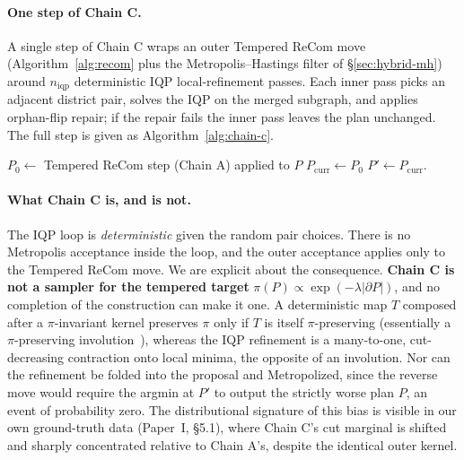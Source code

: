 \documentclass[11pt]{article}
\begin{document}
\paragraph{One step of Chain C.}\label{sec:chain-c-step}
A single step of Chain C wraps an outer Tempered ReCom move
(Algorithm~\ref{alg:recom} plus the Metropolis--Hastings filter of
\S\ref{sec:hybrid-mh}) around $n_{\mathrm{iqp}}$ deterministic
IQP local-refinement passes. Each inner pass picks an adjacent district
pair, solves the IQP on the merged subgraph, and applies orphan-flip
repair; if the repair fails the inner pass leaves the plan unchanged.
The full step is given as Algorithm~\ref{alg:chain-c}.

\begin{algorithm}[H]
\caption{One step of Chain C}\label{alg:chain-c}
$P_0 \gets $ Tempered ReCom step (Chain A) applied to $P$\;
$P_{\mathrm{curr}} \gets P_0$\;
\Return $P' \gets P_{\mathrm{curr}}$.
\end{algorithm}

\paragraph{What Chain C is, and is not.}\label{sec:chain-c-honest}
The IQP loop is \emph{deterministic} given the random pair choices. There is no Metropolis acceptance inside the loop, and the outer
acceptance applies only to the Tempered ReCom move. We are explicit
about the consequence. \textbf{Chain C is not a sampler for the
tempered target} $\pi(P) \propto \exp(-\lambda|\partial P|)$, and no
completion of the construction can make it one. A deterministic map
$T$ composed after a $\pi$-invariant kernel preserves $\pi$ only if
$T$ is itself $\pi$-preserving (essentially a $\pi$-preserving
involution~\cite{tierney1998note}), whereas the IQP refinement is a
many-to-one, cut-decreasing contraction onto local minima, the
opposite of an involution. Nor can the refinement be folded into the
proposal and Metropolized, since the reverse move would require the
argmin at $P'$ to output the strictly worse plan $P$, an event of
probability zero. The distributional signature of this bias is visible
in our own ground-truth data (Paper~I, \S5.1), where Chain C's cut
marginal is shifted and sharply concentrated relative to Chain A's,
despite the identical outer kernel.
\end{document}
